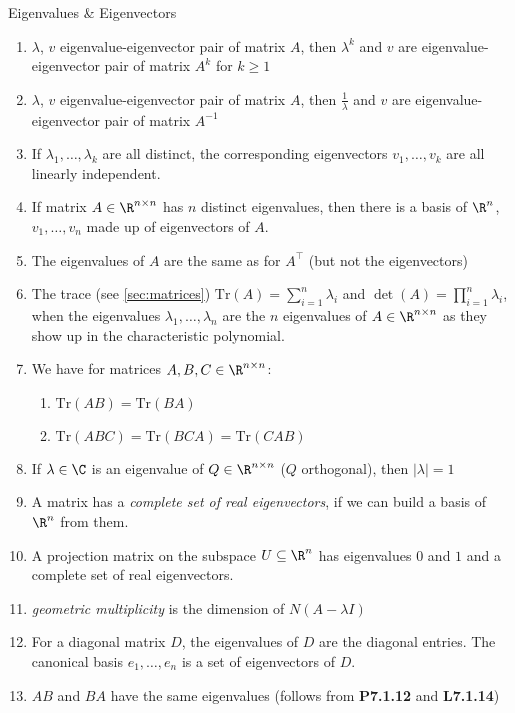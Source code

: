 \setcounter{all}{6}
\begin{properties}[]{Eigenvalues \& Eigenvectors}
    \begin{enumerate}[label=\textbf{(\Roman*)}]
        \item \shortproposition $\lambda$, $v$ eigenvalue-eigenvector pair of matrix $A$, then $\lambda^k$ and $v$ are eigenvalue-eigenvector pair of matrix $A^k$ for $k \geq 1$
        \item \shortproposition $\lambda$, $v$ eigenvalue-eigenvector pair of matrix $A$, then $\frac{1}{\lambda}$ and $v$ are eigenvalue-eigenvector pair of matrix $A^{-1}$
        \item \shortproposition If $\lambda_1, \ldots, \lambda_k$ are all distinct, the corresponding eigenvectors $v_1, \ldots, v_k$ are all linearly independent.
        \item \shorttheorem If matrix $A \in \R^{n \times n}$ has $n$ distinct eigenvalues, then there is a basis of $\R^n$, $v_1, \ldots, v_n$ made up of eigenvectors of $A$.
        \item \shortproposition The eigenvalues of $A$ are the same as for $A^{\top}$ (but not the eigenvectors)
        \item \shortdef The trace (see \ref{sec:matrices}) \shortproposition $\text{Tr}(A) = \sum_{i = 1}^{n} \lambda_i$ and $\det(A) = \prod_{i = 1}^{n} \lambda_i$, when the eigenvalues $\lambda_1, \ldots, \lambda_n$ are the $n$ eigenvalues of $A \in \R^{n \times n}$ as they show up in the characteristic polynomial.
        \item \setcounter{all}{14} \shortlemma We have for matrices $A, B, C \in \R^{n \times n}$:
              \begin{enumerate}[label=(\roman*)]
                  \item $\text{Tr}(AB) = \text{Tr}(BA)$
                  \item $\text{Tr}(ABC) = \text{Tr}(BCA) = \text{Tr}(CAB)$
              \end{enumerate}
        \item \setcounter{all}{17} \shortproposition If $\lambda \in \C$ is an eigenvalue of $Q \in \R^{n \times n}$ ($Q$ orthogonal), then $|\lambda| = 1$
        \item \setcounter{all}{20} \shortdef A matrix has a \textit{complete set of real eigenvectors}, if we can build a basis of $\R^n$ from them.
        \item \shortproposition A projection matrix on the subspace $U \subseteq \R^n$ has eigenvalues $0$ and $1$ and a complete set of real eigenvectors.
        \item \shortdef \textit{geometric multiplicity} is the dimension of $N(A - \lambda I)$
        \item \shortex \hspace{0mm} For a diagonal matrix $D$, the eigenvalues of $D$ are the diagonal entries. The canonical basis $e_1, \ldots, e_n$ is a set of eigenvectors of $D$.
        \item $AB$ and $BA$ have the same eigenvalues (follows from \textbf{P7.1.12} and \textbf{L7.1.14})
    \end{enumerate}
\end{properties}


